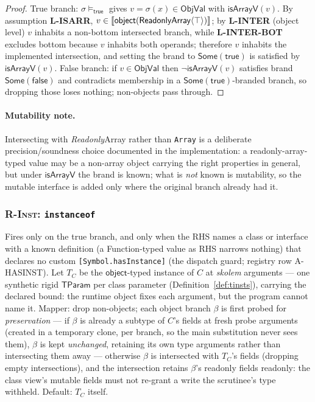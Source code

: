 \documentclass[11pt]{article}
\newcommand{\ObjVal}{\mathsf{ObjVal}}
\newcommand{\TParam}{\mathsf{TParam}}
\begin{document}
\begin{lemma}
\label{lem:r-isarray-sound}
\end{lemma}
\begin{proof}
True branch: $\sigma \models_{\mathsf{true}}$ gives
$v = \sigma(x) \in \ObjVal$ with $\mathsf{isArrayV}(v)$. By assumption
\textbf{L-ISARR}, $v \in
\llbracket \mathsf{object}(\mathsf{ReadonlyArray}\langle\top\rangle) \rrbracket$; by
\textbf{L-INTER} (object level) $v$ inhabits a non-bottom intersected branch,
while \textbf{L-INTER-BOT} excludes bottom because $v$ inhabits both operands;
therefore $v$ inhabits the implemented intersection, and
setting the brand to $\mathsf{Some}(\mathsf{true})$ is satisfied by
$\mathsf{isArrayV}(v)$. False branch: if $v \in \ObjVal$ then
$\neg\mathsf{isArrayV}(v)$ satisfies brand $\mathsf{Some}(\mathsf{false})$
and contradicts membership in a $\mathsf{Some}(\mathsf{true})$-branded
branch, so dropping those loses nothing; non-objects pass through.
\end{proof}

\paragraph{Mutability note.}
Intersecting with \emph{Readonly}Array rather than \texttt{Array} is a
deliberate precision/soundness choice documented in the implementation: a
readonly-array-typed value may be a non-array object carrying the right
properties in general, but under $\mathsf{isArrayV}$ the brand is known; what
is \emph{not} known is mutability, so the mutable interface is added only
where the original branch already had it.

\subsubsection{\textsc{R-Inst}: \texttt{instanceof}}
\label{sec:r-inst}

Fires only on the true branch, and only when the RHS names a class or
interface with a known definition (a Function-typed value as RHS narrows
nothing) that declares no custom \texttt{[Symbol.hasInstance]} (the
dispatch guard; registry row A-HASINST). Let $T_C$ be the
$\mathsf{object}$-typed instance of $C$ at \emph{skolem} arguments — one
synthetic rigid $\TParam$ per class parameter
(Definition~\ref{def:tinsts}), carrying the declared bound: the runtime
object fixes each argument, but the program cannot name it. Mapper: drop
non-objects; each object branch $\beta$ is first probed for
\emph{preservation} — if $\beta$ is already a subtype of $C$'s fields at
fresh probe arguments (created in a temporary clone, per branch, so the
main substitution never sees them), $\beta$ is kept \emph{unchanged},
retaining its own type arguments rather than intersecting them away —
otherwise $\beta$ is intersected with $T_C$'s fields (dropping empty
intersections), and the intersection retains $\beta$'s readonly fields
readonly: the class view's mutable fields must not re-grant a write the
scrutinee's type withheld. Default: $T_C$ itself.
\end{document}
